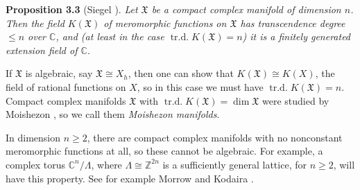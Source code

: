 {\medskip
\noindent\hypertarget{result-B-3.3}{}\textbf{Proposition 3.3} (Siegel ). \emph{Let $\mathfrak X$ be a compact \EditionText{}complex manifold of dimension $n$. Then the field $K(\mathfrak X)$ of meromorphic functions on $\mathfrak X$ has transcendence degree $\leq n$ over $\mathbb C$, and (at least in the case $\operatorname{tr.d.}K(\mathfrak X)=n$) it is a finitely generated extension field of $\mathbb C$.}

\medskip
If $\mathfrak X$ is algebraic, say $\mathfrak X\cong X_h$, then one can show that $K(\mathfrak X)\cong K(X)$, the field of rational functions on $X$, so in this case we must have $\operatorname{tr.d.}K(\mathfrak X)=n$. Compact \EditionText{}complex manifolds $\mathfrak X$ with $\operatorname{tr.d.}K(\mathfrak X)=\dim\mathfrak X$ were studied by Moishezon , so we call them \emph{Moishezon manifolds}.

In dimension $n\geq2$, there are compact complex manifolds with no nonconstant meromorphic functions at all, so these cannot be algebraic. For example, a complex torus $\mathbb C^n/\Lambda$, where $\Lambda\cong\mathbb Z^{2n}$ is a sufficiently general lattice, for $n\geq2$, will have this property. See for example Morrow and Kodaira .
}
